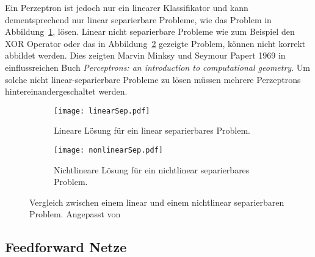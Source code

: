 Ein Perzeptron ist jedoch nur ein linearer Klassifikator und kann dementsprechend nur linear separierbare Probleme, wie das Problem in Abbildung~\ref{subfig:linearSep}, lösen.
Linear nicht separierbare Probleme wie zum Beispiel den XOR Operator oder das in Abbildung~\ref{subfig:nonlinearSep} gezeigte Problem, können nicht korrekt abbildet werden.
Dies zeigten Marvin Minksy und Seymour Papert 1969 in einflussreichen Buch \textit{Perceptrons: an introduction to computational geometry}. 
Um solche nicht linear-separierbare Probleme zu lösen müssen mehrere Perzeptrons hintereinandergeschaltet werden.


\begin{figure}[h]
	\centering
	\begin{subfigure}[t]{0.4\textwidth}
		\texttt{[image: linearSep.pdf]}
		\caption{Lineare Lösung für ein linear separierbares Problem.}
		\label{subfig:linearSep}
	\end{subfigure}
	\quad
	\begin{subfigure}[t]{0.4\textwidth}
		\texttt{[image: nonlinearSep.pdf]}
		\caption{Nichtlineare Lösung für ein nichtlinear separierbares Problem.}
		\label{subfig:nonlinearSep}
	\end{subfigure}
	\caption{Vergleich zwischen einem linear und einem nichtlinear separierbaren Problem. Angepasst von \cite{LinSep}}
	\label{fig:linearNonlinearVgl}
\end{figure}

\subsection{Feedforward Netze}


